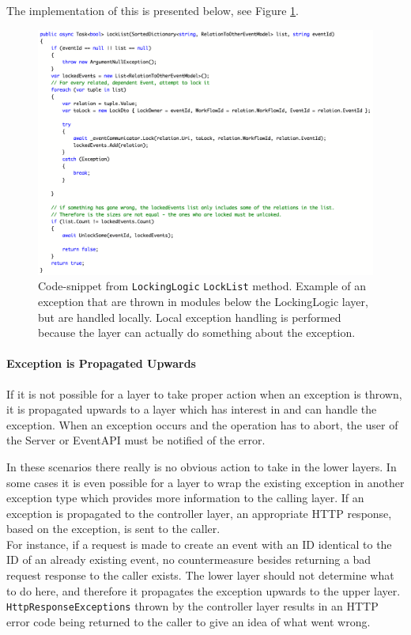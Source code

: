 The implementation of this is presented below, see Figure \ref{fig:LockList}.
\begin{figure}[h!]
\centering
\includegraphics[width=\linewidth]{figures/LockingLogic}
\caption{\label{fig:LockList}Code-snippet from \texttt{LockingLogic} \texttt{LockList} method. Example of an exception that are thrown in modules below the LockingLogic layer, but are handled locally. Local exception handling is performed because the layer can actually do something about the exception. }
\end{figure}

\paragraph{Exception is Propagated Upwards}
If it is not possible for a layer to take proper action when an exception is thrown, it is propagated upwards to a layer which has interest in and can handle the exception.
When an exception occurs and the operation has to abort, the user of the Server or EventAPI must be notified of the error. 

In these scenarios there really is no obvious action to take in the lower layers. In some cases it is even possible for a layer to wrap the existing exception in another exception type which provides more information to the calling layer. If an exception is propagated to the controller layer, an appropriate HTTP response, based on the exception, is sent to the caller.\\

For instance, if a request is made to create an event with an ID identical to the ID of an already existing event, no countermeasure besides returning a bad request response to the caller exists. The lower layer should not determine what to do here, and therefore it propagates the exception upwards to the upper layer. \texttt{HttpResponseExceptions} thrown by the controller layer results in an HTTP error code being returned to the caller to give an idea of what went wrong.

